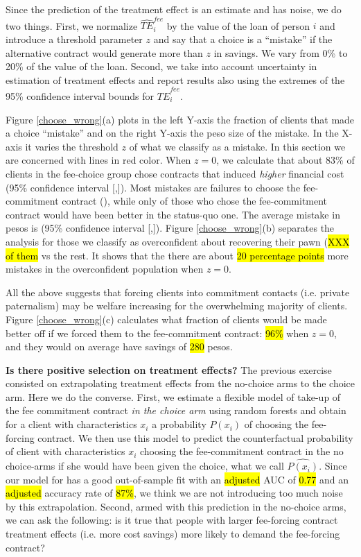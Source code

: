 \documentclass[11pt]{article}
\begin{document}
Since the prediction of the treatment effect is an estimate and has noise, we do two things. First, we normalize $\widehat{TE}^{fee}_{i}$ by the value of the loan of person $i$ and introduce a threshold parameter $z$ and say that a choice is a ``mistake'' if the alternative contract would generate more than $z$ in savings. We vary from 0\% to 20\% of the value of the loan. Second, we take into account uncertainty in estimation of treatment effects and report results also using the extremes of the 95\% confidence interval bounds for $\widehat{TE}^{fee}_{i}$. 

Figure \ref{choose_wrong}(a) plots in the left Y-axis the fraction of clients that made a choice ``mistake'' and on the right Y-axis the peso size of the mistake. In the X-axis it varies the threshold $z$ of what we classify as a mistake. In this section we are concerned with lines in red color. When $z=0$, we calculate that about 83\% of clients in the fee-choice group chose contracts that induced \textit{higher} financial cost (95\% confidence interval [,]). Most mistakes are failures to choose the fee-commitment contract (), while only  of those who chose the fee-commitment contract would have been better in the status-quo one. The average mistake in pesos is  (95\% confidence interval [,]). Figure \ref{choose_wrong}(b) separates the analysis for those we classify as overconfident about recovering their pawn (\hl{XXX of them} vs the rest. It shows that the there are about \hl{20 percentage points} more mistakes in the overconfident population when $z=0$.

All the above suggests that forcing clients into commitment contacts (i.e. private paternalism) may be welfare increasing for the overwhelming majority of clients. Figure \ref{choose_wrong}(c) calculates what fraction of clients would be made better off if we forced them to the fee-commitment contract: \hl{96\%} when $z=0$, and they would on average have savings of \hl{280} pesos.

    
\vspace{.2in}
\noindent \textbf{Is there positive selection on treatment effects?} The previous exercise consisted on extrapolating treatment effects from the no-choice arms to the choice arm. Here we do the converse. First, we estimate a flexible model of take-up of the fee commitment contract \textit{in the choice arm} using random forests and obtain for a client with characteristics $x_i$ a probability $P(x_i)$ of choosing the fee-forcing contract. We then use this model to predict the counterfactual probability of client with characteristics $x_i$ choosing the fee-commitment contract in the no choice-arms if she would have been given the choice, what we call $\widehat{P(x_i)}$. Since our model for has a good out-of-sample fit with an \hl{adjusted} AUC of \hl{0.77} and an \hl{adjusted} accuracy rate of \hl{87\%}, we think we are not introducing too much noise by this extrapolation. Second, armed with this prediction in the no-choice arms, we can ask the following: is it true that people with larger fee-forcing contract treatment effects (i.e. more cost savings) more likely to demand the fee-forcing contract? 
\end{document}
